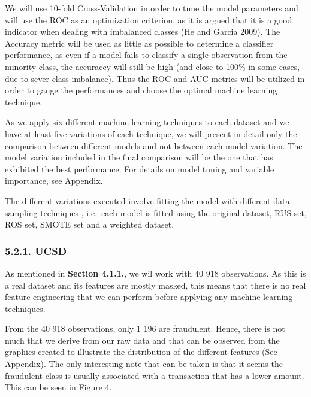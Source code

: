 \documentclass[12pt,]{article}
\begin{document}
We will use 10-fold Cross-Validation in order to tune the model
parameters and will use the ROC as an optimization criterion, as it is
argued that it is a good indicator when dealing with imbalanced classes
(He and Garcia 2009). The Accuracy metric will be used as little as
possible to determine a classifier performance, as even if a model fails
to classify a single observation from the minority class, the accuraccy
will still be high (and close to 100\% in some cases, due to sever class
imbalance). Thus the ROC and AUC metrics will be utilized in order to
gauge the performances and choose the optimal machine learning
technique.

As we apply six different machine learning techniques to each dataset
and we have at least five variations of each technique, we will present
in detail only the comparison between different models and not between
each model variation. The model variation included in the final
comparison will be the one that has exhibited the best performance. For
details on model tuning and variable importance, see Appendix.

The different variations executed involve fitting the model with
different data-sampling techniques , i.e.~each model is fitted using the
original dataset, RUS set, ROS set, SMOTE set and a weighted dataset.

\hypertarget{ucsd}{%
\subsubsection{5.2.1. UCSD}\label{ucsd}}

As mentioned in \textbf{Section 4.1.1.}, we wil work with 40 918
observations. As this is a real dataset and its features are mostly
masked, this means that there is no real feature engineering that we can
perform before applying any machine learning techniques.

From the 40 918 observations, only 1 196 are fraudulent. Hence, there is
not much that we derive from our raw data and that can be observed from
the graphics created to illustrate the distribution of the different
features (See Appendix). The only interesting note that can be taken is
that it seems the fraudulent class is usually associated with a
transaction that has a lower amount. This can be seen in Figure 4.
\end{document}
